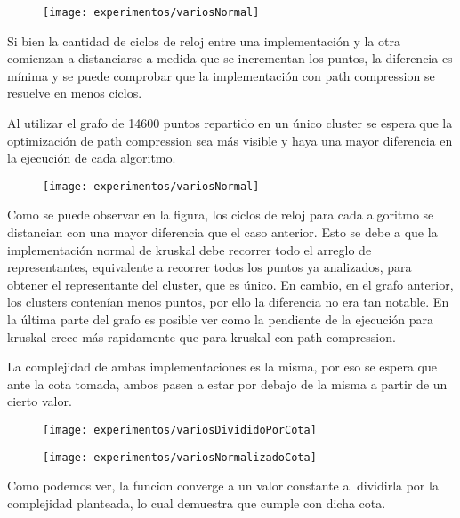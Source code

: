 \begin{figure}[H]
	\centering
	\begin{minipage}[t]{.3\textwidth}
		\centering
		\texttt{[image: experimentos/variosNormal]}
	\end{minipage}
\end{figure}

Si bien la cantidad de ciclos de reloj entre una implementación y la otra comienzan a distanciarse a medida que se incrementan los puntos, la diferencia es mínima y se puede comprobar que la implementación con path compression se resuelve en menos ciclos.



Al utilizar el grafo de 14600 puntos repartido en un único cluster se espera que la optimización de path compression sea más visible y haya una mayor diferencia en la ejecución de cada algoritmo. 

\begin{figure}[H]
	\centering
	\begin{minipage}[t]{.3\textwidth}
		\centering
		\texttt{[image: experimentos/variosNormal]}
	\end{minipage}
\end{figure}

Como se puede observar en la figura, los ciclos de reloj para cada algoritmo se distancian con una mayor diferencia que el caso anterior. Esto se debe a que la implementación normal de kruskal debe recorrer todo el arreglo de representantes, equivalente a recorrer todos los puntos ya analizados, para obtener el representante del cluster, que es único. En cambio, en el grafo anterior, los clusters contenían menos puntos, por ello la diferencia no era tan notable. En la última parte del grafo es posible ver como la pendiente de la ejecución para kruskal crece más rapidamente que para kruskal con path compression.



La complejidad de ambas implementaciones es la misma, por eso se espera que ante la cota tomada, ambos pasen a estar por debajo de la misma a partir de un cierto valor.

\begin{figure}[H]
	\centering
	\begin{minipage}[t]{.3\textwidth}
		\centering
		\texttt{[image: experimentos/variosDivididoPorCota]}
	\end{minipage}
	\centering
	\begin{minipage}[t]{.3\textwidth}
		\centering
		\texttt{[image: experimentos/variosNormalizadoCota]}
	\end{minipage}
\end{figure}

Como podemos ver, la funcion converge a un valor constante al dividirla por la complejidad planteada, lo cual demuestra que cumple con dicha cota.